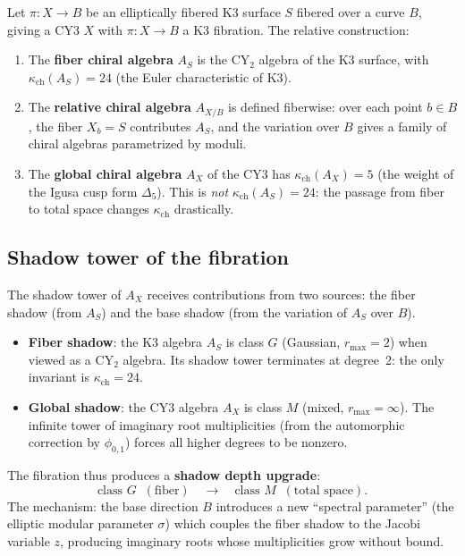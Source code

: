 \documentclass[11pt]{article}
\theoremstyle{plain}
\theoremstyle{definition}
\theoremstyle{remark}
\newcommand{\CY}{\mathrm{CY}}
\begin{document}
Let $\pi \colon X \to B$ be an elliptically fibered K3 surface
$S$ fibered over a curve $B$, giving a CY3 $X$ with
$\pi \colon X \to B$ a K3 fibration. The relative construction:

\begin{enumerate}[label=(\roman*)]
 \item The \textbf{fiber chiral algebra} $A_S$ is the $\CY_2$
 algebra of the K3 surface, with $\kappa_{\mathrm{ch}}(A_S) = 24$ (the
 Euler characteristic of K3).

 \item The \textbf{relative chiral algebra} $A_{X/B}$ is
 defined fiberwise: over each point $b \in B$, the fiber
 $X_b = S$ contributes $A_S$, and the variation over $B$
 gives a family of chiral algebras parametrized by moduli.

 \item The \textbf{global chiral algebra} $A_X$ of the CY3
 has $\kappa_{\mathrm{ch}}(A_X) = 5$ (the weight of the Igusa cusp form
 $\Delta_5$). This is \emph{not} $\kappa_{\mathrm{ch}}(A_S) = 24$:
 the passage from fiber to total space changes $\kappa_{\mathrm{ch}}$
 drastically.
\end{enumerate}

\subsection{Shadow tower of the fibration}

The shadow tower of $A_X$ receives contributions from two
sources: the fiber shadow (from $A_S$) and the base shadow
(from the variation of $A_S$ over $B$).

\begin{itemize}
 \item \textbf{Fiber shadow}: the K3 algebra $A_S$ is
 class $G$ (Gaussian, $r_{\max} = 2$) when viewed as a
 $\CY_2$ algebra. Its shadow tower terminates at degree~2:
 the only invariant is $\kappa_{\mathrm{ch}} = 24$.

 \item \textbf{Global shadow}: the CY3 algebra $A_X$ is
 class $M$ (mixed, $r_{\max} = \infty$). The infinite
 tower of imaginary root multiplicities (from the
 automorphic correction by $\phi_{0,1}$) forces all
 higher degrees to be nonzero.
\end{itemize}

\noindent
The fibration thus produces a \textbf{shadow depth upgrade}:
\[
 \text{class } G \;\;(\text{fiber}) \quad\longrightarrow\quad
 \text{class } M \;\;(\text{total space}).
\]
The mechanism: the base direction $B$ introduces a new
``spectral parameter'' (the elliptic modular parameter
$\sigma$) which couples the fiber shadow to the Jacobi
variable $z$, producing imaginary roots whose multiplicities
grow without bound.
\end{document}
